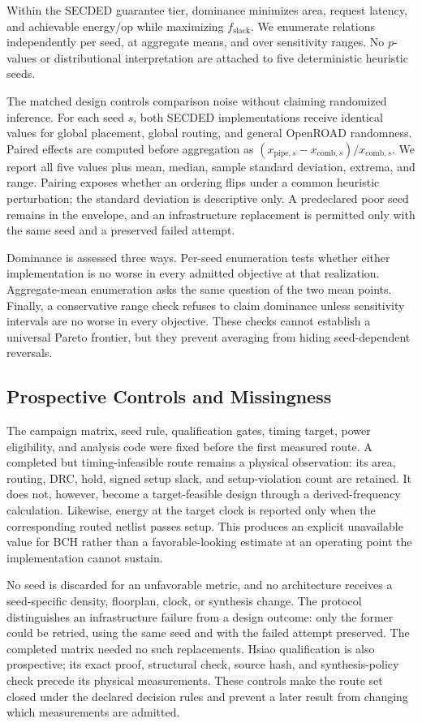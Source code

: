 Within the SECDED guarantee tier, dominance minimizes area, request latency, and achievable energy/op while maximizing $f_{\mathrm{slack}}$. We enumerate relations independently per seed, at aggregate means, and over sensitivity ranges. No $p$-values or distributional interpretation are attached to five deterministic heuristic seeds.

The matched design controls comparison noise without claiming randomized inference. For each seed $s$, both SECDED implementations receive identical values for global placement, global routing, and general OpenROAD randomness. Paired effects are computed before aggregation as $(x_{\mathrm{pipe},s}-x_{\mathrm{comb},s})/x_{\mathrm{comb},s}$. We report all five values plus mean, median, sample standard deviation, extrema, and range. Pairing exposes whether an ordering flips under a common heuristic perturbation; the standard deviation is descriptive only. A predeclared poor seed remains in the envelope, and an infrastructure replacement is permitted only with the same seed and a preserved failed attempt.

Dominance is assessed three ways. Per-seed enumeration tests whether either implementation is no worse in every admitted objective at that realization. Aggregate-mean enumeration asks the same question of the two mean points. Finally, a conservative range check refuses to claim dominance unless sensitivity intervals are no worse in every objective. These checks cannot establish a universal Pareto frontier, but they prevent averaging from hiding seed-dependent reversals.

\subsection{Prospective Controls and Missingness}

The campaign matrix, seed rule, qualification gates, timing target, power eligibility, and analysis code were fixed before the first measured route. A completed but timing-infeasible route remains a physical observation: its area, routing, DRC, hold, signed setup slack, and setup-violation count are retained. It does not, however, become a target-feasible design through a derived-frequency calculation. Likewise, energy at the target clock is reported only when the corresponding routed netlist passes setup. This produces an explicit unavailable value for BCH rather than a favorable-looking estimate at an operating point the implementation cannot sustain.

No seed is discarded for an unfavorable metric, and no architecture receives a seed-specific density, floorplan, clock, or synthesis change. The protocol distinguishes an infrastructure failure from a design outcome: only the former could be retried, using the same seed and with the failed attempt preserved. The completed matrix needed no such replacements. Hsiao qualification is also prospective; its exact proof, structural check, source hash, and synthesis-policy check precede its physical measurements. These controls make the route set closed under the declared decision rules and prevent a later result from changing which measurements are admitted.

